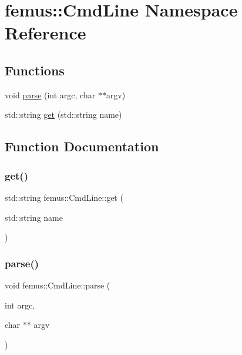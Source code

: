 \hypertarget{namespacefemus_1_1_cmd_line}{}\section{femus\+:\+:Cmd\+Line Namespace Reference}
\label{namespacefemus_1_1_cmd_line}
\subsection*{Functions}
\begin{DoxyCompactItemize}
\item 
void \mbox{\hyperlink{namespacefemus_1_1_cmd_line_a0bd1f2fb2a939f3bb6a7b46b7dc75fb9}{parse}} (int argc, char $\ast$$\ast$argv)
\item 
std\+::string \mbox{\hyperlink{namespacefemus_1_1_cmd_line_ab945ad444a5c2a2b92f07bbab19f4c89}{get}} (std\+::string name)
\end{DoxyCompactItemize}


\subsection{Function Documentation}
\mbox{\label{namespacefemus_1_1_cmd_line_ab945ad444a5c2a2b92f07bbab19f4c89}} 
\subsubsection{\texorpdfstring{get()}{get()}}
{\footnotesize\ttfamily std\+::string femus\+::\+Cmd\+Line\+::get (\begin{DoxyParamCaption}\item[{std\+::string}]{name }\end{DoxyParamCaption})}

\mbox{\label{namespacefemus_1_1_cmd_line_a0bd1f2fb2a939f3bb6a7b46b7dc75fb9}} 
\subsubsection{\texorpdfstring{parse()}{parse()}}
{\footnotesize\ttfamily void femus\+::\+Cmd\+Line\+::parse (\begin{DoxyParamCaption}\item[{int}]{argc,  }\item[{char $\ast$$\ast$}]{argv }\end{DoxyParamCaption})\hspace{0.3cm}{\ttfamily [inline]}}

